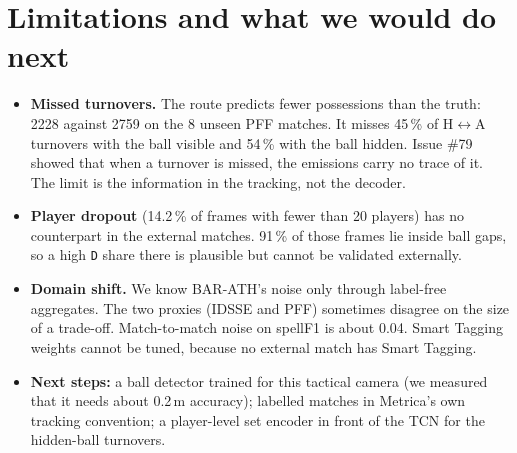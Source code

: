 \documentclass[10pt,a4paper]{article}
\newcommand{\code}[1]{\texttt{\small #1}}
\begin{document}
\section{Limitations and what we would do next}
\begin{itemize}
\item \textbf{Missed turnovers.} The route predicts fewer possessions than the truth: 2228 against 2759 on the 8 unseen PFF matches. It misses 45\,\% of H$\leftrightarrow$A turnovers with the ball visible and 54\,\% with the ball hidden. Issue \#79 showed that when a turnover is missed, the emissions carry no trace of it. The limit is the information in the tracking, not the decoder.
\item \textbf{Player dropout} (14.2\,\% of frames with fewer than 20 players) has no counterpart in the external matches. 91\,\% of those frames lie inside ball gaps, so a high \code{D} share there is plausible but cannot be validated externally.
\item \textbf{Domain shift.} We know BAR-ATH's noise only through label-free aggregates. The two proxies (IDSSE and PFF) sometimes disagree on the size of a trade-off. Match-to-match noise on spellF1 is about 0.04. Smart Tagging weights cannot be tuned, because no external match has Smart Tagging.
\item \textbf{Next steps:} a ball detector trained for this tactical camera (we measured that it needs about 0.2\,m accuracy); labelled matches in Metrica's own tracking convention; a player-level set encoder in front of the TCN for the hidden-ball turnovers.
\end{itemize}
\end{document}

